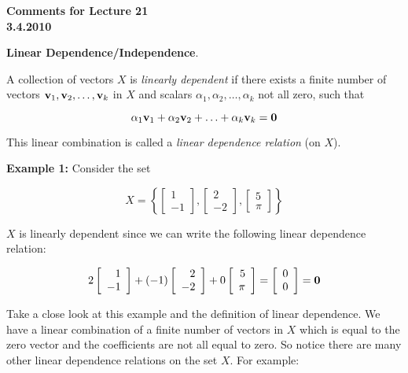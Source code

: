 \documentclass[12pt]{article}
\begin{document}
\begin{center}
{\large \bf Comments for Lecture 21}\\
\bf{3.4.2010}
\end{center}


\begin{center}{\LARGE \bf Linear Dependence/Independence}.\end{center}

A collection of vectors $X$ is {\it linearly dependent} if there exists a finite number of vectors ${\bf v}_1,{\bf v}_2,\ldots,{\bf v}_k$ in $X$ and scalars $\alpha_1,\alpha_2,\ldots,\alpha_k$ not all zero, such that 

\[ \alpha_1 {\bf v}_1 + \alpha_2 {\bf v}_2 + \ldots + \alpha_k {\bf v}_k = {\bf 0} \]

This linear combination is called a {\it linear dependence relation} (on $X$).

{\bf Example 1:} Consider the set 

\[X = \left\{ \left[ \begin{array}{r} 1  \\ -1  \end{array} \right], \left[ \begin{array}{r} 2  \\ -2  \end{array} \right], \left[ \begin{array}{r} 5  \\ \pi  \end{array}\right] \right\} \]

$X$ is linearly dependent since we can write the following linear dependence relation:

\[ 2\left[ \begin{array}{r} 1  \\ -1  \end{array} \right] + (-1) \left[ \begin{array}{r} 2  \\ -2  \end{array} \right] + 0 \left[ \begin{array}{r} 5  \\ \pi  \end{array} \right] = \left[ \begin{array}{r} 0  \\ 0  \end{array} \right] = {\bf 0} \]

Take a close look at this example and the definition of linear dependence.  We have a linear combination of a finite number of vectors in $X$ which is equal to the zero vector and the coefficients are not all equal to zero.  So notice there are many other linear dependence relations on the set $X$.  For example:
\end{document}
